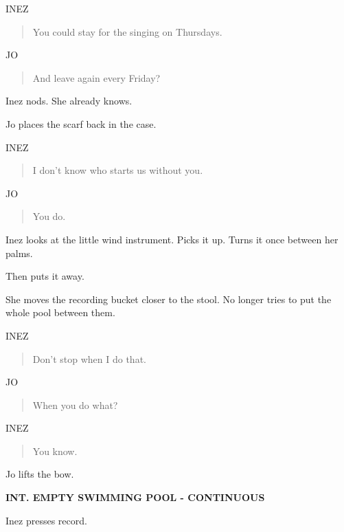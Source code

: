 \documentclass[12pt,letterpaper]{article}
\newcommand{\scene}[1]{\needspace{5\baselineskip}\vspace{8pt}\textbf{#1}\par}
\newcommand{\character}[1]{\needspace{4\baselineskip}\hspace*{2.2in}#1\par\nopagebreak}
\begin{document}
\character{INEZ}
\begin{quote}You could stay for the singing on Thursdays.\par\end{quote}

\character{JO}
\begin{quote}And leave again every Friday?\par\end{quote}

Inez nods. She already knows.\par

Jo places the scarf back in the case.\par

\character{INEZ}
\begin{quote}I don't know who starts us without you.\par\end{quote}

\character{JO}
\begin{quote}You do.\par\end{quote}

Inez looks at the little wind instrument. Picks it up. Turns it once between her palms.\par

Then puts it away.\par

She moves the recording bucket closer to the stool. No longer tries to put the whole pool between them.\par

\character{INEZ}
\begin{quote}Don't stop when I do that.\par\end{quote}

\character{JO}
\begin{quote}When you do what?\par\end{quote}

\character{INEZ}
\begin{quote}You know.\par\end{quote}

Jo lifts the bow.\par

\scene{INT. EMPTY SWIMMING POOL - CONTINUOUS}

Inez presses record.\par
\end{document}
